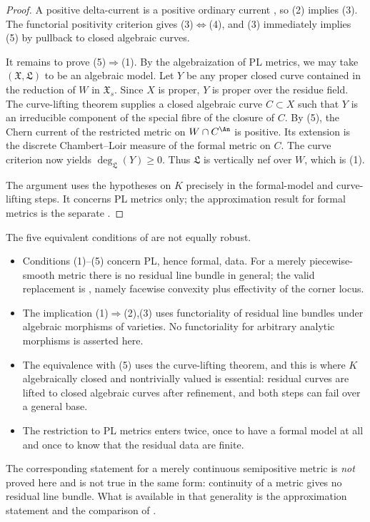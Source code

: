 \begin{proof}
A positive delta-current is a positive ordinary current
\cite[Remark~2.12]{GK19}, so (2) implies (3).  The functorial positivity
criterion \cite[Proposition~2.13]{GK19} gives (3)$\Leftrightarrow$(4), and
(3) immediately implies (5) by pullback to closed algebraic curves.

It remains to prove (5)$\Rightarrow$(1).  By the algebraization of PL
metrics, we may take $(\mathfrak X,\mathfrak L)$ to be an algebraic model.
Let $Y$ be any proper closed curve contained in the reduction of $W$
in $\mathfrak X_s$.  Since $X$ is proper, $Y$ is proper over the residue
field.  The curve-lifting theorem \cite[Theorem~4.1]{GK19} supplies a closed
algebraic curve $C\subset X$ such that $Y$ is an irreducible component of the
special fibre of the closure of $C$.  By (5), the Chern current of the
restricted metric on $W\cap C^{\An}$ is positive.  Its extension is the
discrete Chambert--Loir measure of the formal metric on $C$.  The curve
criterion \cite[Lemma~6.8]{GK19} now yields
$
  \deg_{\mathfrak L}(Y)\geq0.
$
Thus $\mathfrak L$ is vertically nef over $W$, which is (1).

The argument uses the hypotheses on $K$ precisely in the formal-model and
curve-lifting steps.  It concerns PL metrics only; the approximation result
for formal metrics is the separate \cite[Proposition~7.2]{GK19}.
\end{proof}

\begin{remark}
\label{rem:ch18-gk-positivity-hypotheses}
The five equivalent conditions of
 are not equally robust.
\begin{itemize}
\item Conditions (1)--(5) concern PL, hence formal, data.  For a merely
 piecewise-smooth metric there is no residual line bundle in general; the
 valid replacement is , namely
 facewise convexity plus effectivity of the corner locus.
\item The implication (1)$\Rightarrow$(2),(3) uses functoriality of residual
 line bundles under algebraic morphisms of varieties.  No functoriality for
 arbitrary analytic morphisms is asserted here.
\item The equivalence with (5) uses the curve-lifting theorem, and this is
 where $K$ algebraically closed and nontrivially valued is essential:
 residual curves are lifted to closed algebraic curves after refinement, and
 both steps can fail over a general base.
\item The restriction to PL metrics enters twice, once to have a formal
 model at all and once to know that the residual data are finite.
\end{itemize}
The corresponding statement for a merely continuous semipositive metric is
\emph{not} proved here and is not true in the same form: continuity of a
metric gives no residual line bundle.  What is available in that generality
is the approximation statement  and the
comparison of .
\end{remark}

